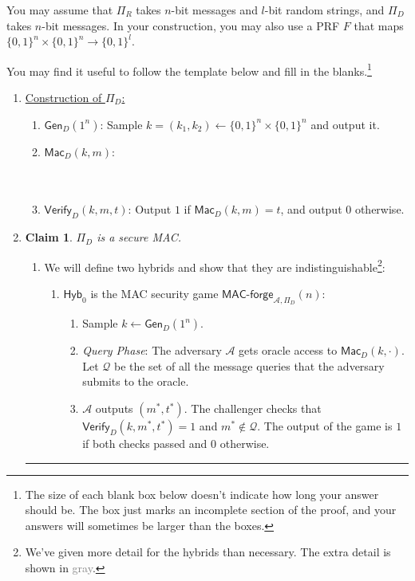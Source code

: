 \documentclass[11pt]{article}
\newcommand\custombox[2]{%
    \fbox{\rule{#1}{0pt}\rule[-0.5ex]{0pt}{#2}}}
\newcommand{\qed}{\hspace*{\fill}\rule{7pt}{7pt}}
\newtheorem{claim}[theorem]{Claim}
\numberwithin{equation}{section}
\newenvironment{proof}{\noindent{\bf Proof}\hspace*{1em}}{\qed\medskip}
\newcommand{\Gen}{\mathsf{Gen}}
\newcommand{\A}{\mathcal{A}}
\newcommand{\hyb}{\mathsf{Hyb}}
\newcommand{\bin}{\{0,1\}}
\newcommand{\bit}{\bin}
\newcommand{\gen}{\mathsf{Gen}}
\newcommand{\mac}{\mathsf{Mac}}
\newcommand{\verify}{\mathsf{Verify}}
\begin{document}
You may assume that $\Pi_R$ takes $n$-bit messages and $l$-bit random strings, and $\Pi_D$ takes $n$-bit messages. In your construction, you may also use a PRF $F$ that maps $\bin^n \times \bin^{n} \to \bin^{l}$. \newline

\noindent You may find it useful to follow the template below and fill in the blanks.\footnote{The size of each blank box below doesn't indicate how long your answer should be. The box just marks an incomplete section of the proof, and your answers will sometimes be larger than the boxes.}

\begin{enumerate}
\item \noindent\underline{Construction of $\Pi_D$:}
\begin{enumerate}
    \item $\Gen_D(1^n)$: Sample $k = (k_1, k_2) \leftarrow \bit^n \times \bit^n$ and output it.
    \item $\mac_D(k,m)$:
    \\\\ 
    \custombox{5in}{.5in}\\
    \item $\verify_D(k,m,t)$: Output $1$ if $\mac_D(k,m) = t$, and output $0$ otherwise.
\end{enumerate}

\item 
\begin{claim}
    $\Pi_D$ is a secure MAC.
\end{claim}
\begin{proof}
\begin{enumerate}
    \item We will define two hybrids and show that they are indistinguishable\footnote{We've given more detail for the hybrids than necessary. The extra detail is shown in \textcolor{gray}{gray}.}:
    \begin{enumerate}
        \item $\hyb_0$ is the MAC security game $\mathsf{MAC\text{-}forge}_{\A, \Pi_D}(n)$:
        {\color{gray}\begin{enumerate}
            \item Sample $k \leftarrow \gen_D(1^n)$.
            \item \textit{Query Phase}: The adversary $\A$ gets oracle access to $\mac_D(k, \cdot)$. Let $\mathcal{Q}$ be the set of all the message queries that the adversary submits to the oracle.
            \item $\A$ outputs $(m^*, t^*)$. The challenger checks that $\verify_D(k, m^*, t^*) = 1$ and $m^* \notin \mathcal{Q}$. The output of the game is $1$ if both checks passed and $0$ otherwise.
        \end{enumerate}
        }
        

\end{enumerate}
\end{enumerate}
\end{proof}
\end{enumerate}
\end{document}
